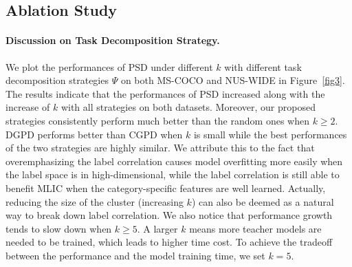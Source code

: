 \documentclass{article}
\begin{document}
\vspace{-0.1cm}
\subsection{Ablation Study}

\paragraph{Discussion on Task Decomposition Strategy.}We plot the performances of PSD under different $k$ with different task decomposition strategies $\Psi$ on both MS-COCO and NUS-WIDE in Figure~\ref{fig3}.
The results indicate that the performances of PSD increased along with the increase of $k$ with all strategies on both datasets.
Moreover, our proposed strategies consistently perform much better than the random ones when $k\geq2$.
DGPD performs better than CGPD when $k$ is small while the best performances of the two strategies are highly similar.
We attribute this to the fact that overemphasizing the label correlation causes model overfitting more easily when the label space is in high-dimensional, while the label correlation is still able to benefit MLIC when the category-specific features are well learned.
Actually, reducing the size of the cluster (increasing $k$) can also be deemed as a natural way to break down label correlation.
We also notice that performance growth tends to slow down when $k\geq5$.
A larger $k$ means more teacher models are needed to be trained, which leads to higher time cost. To achieve the tradeoff between the performance and the model training time, we set $k = 5$.
\end{document}
